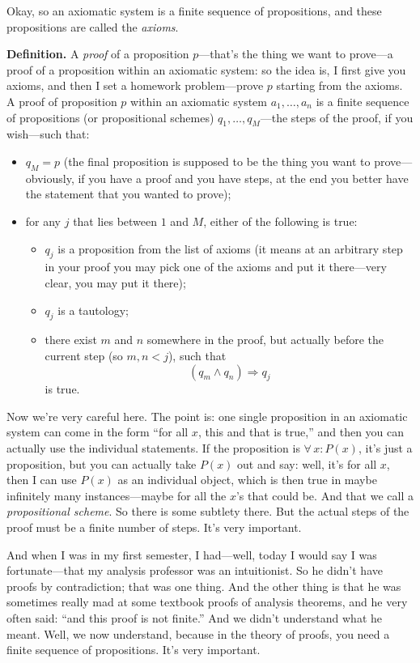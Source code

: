 Okay, so an axiomatic system is a finite sequence of propositions, and these propositions are called the \emph{axioms}.

\textbf{Definition.} A \emph{proof} of a proposition $p$---that's the thing we want to prove---a proof of a proposition within an axiomatic system: so the idea is, I first give you axioms, and then I set a homework problem---prove $p$ starting from the axioms. A proof of proposition $p$ within an axiomatic system $a_1, \ldots, a_n$ is a finite sequence of propositions (or propositional schemes) $q_1, \ldots, q_M$---the steps of the proof, if you wish---such that:
\begin{itemize}
\item $q_M = p$ (the final proposition is supposed to be the thing you want to prove---obviously, if you have a proof and you have steps, at the end you better have the statement that you wanted to prove);
\item for any $j$ that lies between $1$ and $M$, either of the following is true:
\begin{itemize}
\item[\textbf{(A)}] $q_j$ is a proposition from the list of axioms (it means at an arbitrary step in your proof you may pick one of the axioms and put it there---very clear, you may put it there);
\item[\textbf{(T)}] $q_j$ is a tautology;
\item[\textbf{(M)}] there exist $m$ and $n$ somewhere in the proof, but actually before the current step (so $m, n < j$), such that
\[
(q_m \land q_n) \Rightarrow q_j
\]
is true.
\end{itemize}
\end{itemize}

Now we're very careful here. The point is: one single proposition in an axiomatic system can come in the form ``for all $x$, this and that is true,'' and then you can actually use the individual statements. If the proposition is $\forall\, x : P(x)$, it's just a proposition, but you can actually take $P(x)$ out and say: well, it's for all $x$, then I can use $P(x)$ as an individual object, which is then true in maybe infinitely many instances---maybe for all the $x$'s that could be. And that we call a \emph{propositional scheme}. So there is some subtlety there. But the actual steps of the proof must be a finite number of steps. It's very important.

And when I was in my first semester, I had---well, today I would say I was fortunate---that my analysis professor was an intuitionist. So he didn't have proofs by contradiction; that was one thing. And the other thing is that he was sometimes really mad at some textbook proofs of analysis theorems, and he very often said: ``and this proof is not finite.'' And we didn't understand what he meant. Well, we now understand, because in the theory of proofs, you need a finite sequence of propositions. It's very important.

